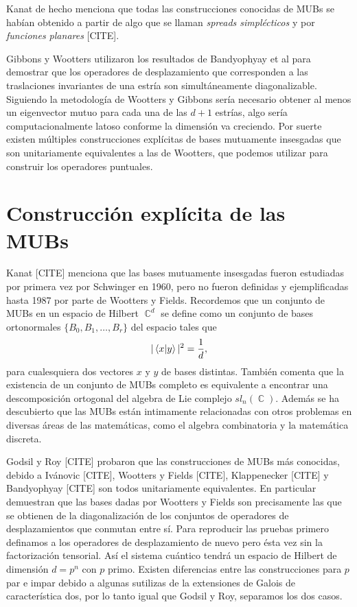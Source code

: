 \documentclass[a4paper]{report}
\DeclareMathOperator{\C}{\mathbb{C}}
\begin{document}
  Kanat de hecho menciona que todas las
  construcciones conocidas de MUBs se habían obtenido a
  partir de algo que se llaman \textit{spreads simplécticos}
  y por \textit{funciones planares} [CITE]. 

  
  Gibbons y Wootters utilizaron los resultados de
  Bandyophyay et al para demostrar que los operadores de
  desplazamiento que corresponden a las traslaciones
  invariantes de una estría son simultáneamente
  diagonalizable. Siguiendo la metodología de Wootters y
  Gibbons sería necesario obtener al menos un eigenvector
  mutuo para cada una de las $d+1$ estrías, algo sería
  computacionalmente latoso conforme la dimensión va
  creciendo. Por suerte existen múltiples construcciones
  explícitas de bases mutuamente insesgadas que son
  unitariamente equivalentes a las de Wootters,
  que podemos utilizar para construir los operadores
  puntuales.

  \section{Construcción explícita de las MUBs}

  Kanat [CITE] menciona que las bases mutuamente insesgadas
  fueron estudiadas por primera vez por Schwinger en 1960,
  pero no fueron definidas y ejemplificadas hasta 1987 por
  parte de Wootters y Fields. Recordemos que un conjunto de
  MUBs en un espacio de Hilbert $\C^{d}$ se define como un
  conjunto de bases ortonormales $\{B_0,B_1,\ldots,B_r\}$ 
  del espacio tales que
  \[
    |\braket{x|y}|^2 = \frac{1}{d},
  \] 
  para cualesquiera dos vectores $x$ y $y$ de bases
  distintas. También comenta que la existencia de un
  conjunto de MUBs completo es equivalente a encontrar una
  descomposición ortogonal del algebra de Lie complejo
  $sl_n(\C)$. Además se ha descubierto que las MUBs están
  intimamente relacionadas con otros problemas en diversas
  áreas de las matemáticas, como el algebra combinatoria y
  la matemática discreta.

  Godsil y Roy [CITE] probaron que las construcciones de
  MUBs más conocidas, debido a Ivánovic [CITE], Wootters y
  Fields [CITE], Klappenecker [CITE] y Bandyophyay [CITE]
  son todos unitariamente equivalentes. En particular
  demuestran que las bases dadas por Wootters y Fields son
  precisamente las que se obtienen de la diagonalización de
  los conjuntos de operadores de desplazamientos que
  conmutan entre sí. Para reproducir las pruebas primero
  definamos a los operadores de desplazamiento de nuevo pero
  ésta vez sin la factorización tensorial. Así el sistema
  cuántico tendrá un espacio de Hilbert de dimensión $d =
  p^{n}$ con $p$ primo. Existen diferencias entre las
  construcciones para $p$ par e impar debido a algunas
  sutilizas de la extensiones de Galois de característica
  dos, por lo tanto igual que Godsil y Roy, separamos los
  dos casos.
\end{document}
